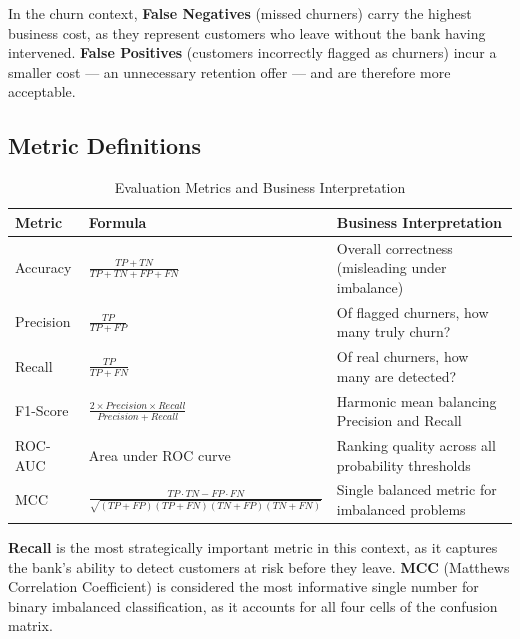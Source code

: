 In the churn context, \textbf{False Negatives} (missed churners) carry the highest business cost, as they represent customers who leave without the bank having intervened. \textbf{False Positives} (customers incorrectly flagged as churners) incur a smaller cost — an unnecessary retention offer — and are therefore more acceptable.

\subsection{Metric Definitions}

\begin{table}[H]
    \centering
    \caption{Evaluation Metrics and Business Interpretation}
    \label{tab:metrics_def}
    \vspace{3mm}
    \begin{tabular}{|l|l|p{6.5cm}|}
        \hline
        \textbf{Metric} & \textbf{Formula} & \textbf{Business Interpretation} \\
        \hline
        Accuracy & $\frac{TP + TN}{TP + TN + FP + FN}$ & Overall correctness (misleading under imbalance) \\
        \hline
        Precision & $\frac{TP}{TP + FP}$ & Of flagged churners, how many truly churn? \\
        \hline
        Recall & $\frac{TP}{TP + FN}$ & Of real churners, how many are detected? \\
        \hline
        F1-Score & $\frac{2 \times Precision \times Recall}{Precision + Recall}$ & Harmonic mean balancing Precision and Recall \\
        \hline
        ROC-AUC & Area under ROC curve & Ranking quality across all probability thresholds \\
        \hline
        MCC & $\frac{TP \cdot TN - FP \cdot FN}{\sqrt{(TP+FP)(TP+FN)(TN+FP)(TN+FN)}}$ & Single balanced metric for imbalanced problems \\
        \hline
    \end{tabular}
\end{table}

\textbf{Recall} is the most strategically important metric in this context, as it captures the bank's ability to detect customers at risk before they leave. \textbf{MCC} (Matthews Correlation Coefficient) is considered the most informative single number for binary imbalanced classification, as it accounts for all four cells of the confusion matrix.

